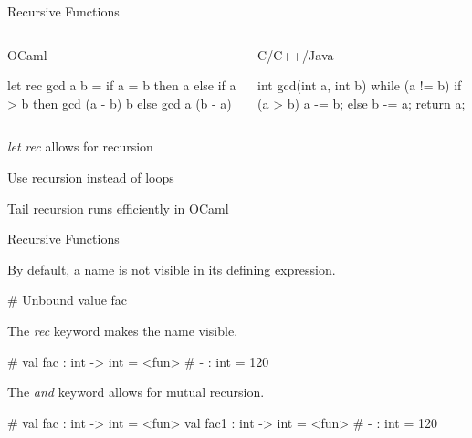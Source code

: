 \documentclass{plt}
\begin{document}
\begin{frame}[fragile]{Recursive Functions}

  \begin{columns}
    \begin{column}[t]{0.5\textwidth}
OCaml

\begin{ocaml}
let rec gcd a b =
  if a = b then
    a
  else if a > b then
    gcd (a - b) b
  else
    gcd a (b - a)
\end{ocaml}
    \end{column}
    \begin{column}[t]{0.5\textwidth}
C/C++/Java

\begin{C}
int gcd(int a, int b)
{
  while (a != b) {
    if (a > b)
      a -= b;
    else
      b -= a;
  }
  return a;
}
\end{C}
    \end{column}
  \end{columns}

\emph{let} \emph{rec} allows for recursion

Use recursion instead of loops
  
Tail recursion runs efficiently in OCaml
\end{frame}

\begin{frame}[fragile]{Recursive Functions}

By default, a name is not visible in its defining expression.

\begin{interactive}
# 
Unbound value fac
\end{interactive}
The \emph{rec} keyword makes the name visible.

\begin{interactive}
# 
val fac : int -> int = <fun>
# 
- : int = 120
\end{interactive}
The \emph{and} keyword allows for mutual recursion.

\begin{interactive}
# 
val fac : int -> int = <fun>
val fac1 : int -> int = <fun>
# 
- : int = 120
\end{interactive}

\end{frame}
\end{document}
